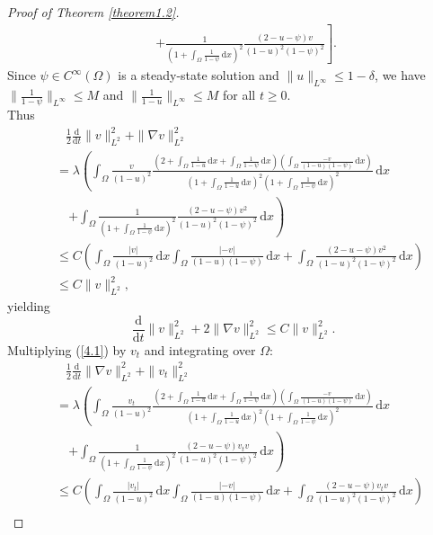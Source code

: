 \documentclass[10pt,a4paper]{amsart}
\begin{document}
\begin{proof}[Proof of Theorem \ref{theorem1.2}]
\begin{align*}
    &\quad\ \left.+\frac{1}{(1+\int_{\Omega}\frac{1}{1-\psi}\,\mathrm{d}x)^2}\frac{(2-u-\psi)v}{(1-u)^2(1-\psi)^2}\right].
\end{align*}
Since $\psi\in C^{\infty}(\Omega)$ is a steady-state solution and $\|u\|_{L^{\infty}}\le 1-\delta$, we have $\|\frac{1}{1-\psi}\|_{L^{\infty}}\le M$ and $\|\frac{1}{1-u}\|_{L^{\infty}}\le M$ for all $t\ge 0$.\\
\noindent
Thus
\begin{align*}
    &\quad\frac{1}{2}\frac{\mathrm{d}}{\mathrm{d}t}\|v\|_{L^2}^2+\|\nabla v\|_{L^2}^2\\
    &\ =\lambda\left(\int_{\Omega}\frac{v}{(1-u)^2}\frac{(2+\int_{\Omega}\frac{1}{1-u}\,\mathrm{d}x+\int_{\Omega}\frac{1}{1-\psi}\,\mathrm{d}x)(\int_{\Omega}\frac{-v}{(1-u)(1-\psi)}\,\mathrm{d}x)}{(1+\int_{\Omega}\frac{1}{1-u}\,\mathrm{d}x)^2(1+\int_{\Omega}\frac{1}{1-\psi}\,\mathrm{d}x)^2}\,\mathrm{d}x\right.\\
    &\quad\ \left.+\int_{\Omega}\frac{1}{(1+\int_{\Omega}\frac{1}{1-\psi}\,\mathrm{d}x)^2}\frac{(2-u-\psi)v^2}{(1-u)^2(1-\psi)^2}\,\mathrm{d}x\right)\\
    &\ \le C\left(\int_{\Omega}\frac{|v|}{(1-u)^2}\,\mathrm{d}x\int_{\Omega}\frac{|-v|}{(1-u)(1-\psi)}\,\mathrm{d}x+\int_{\Omega}\frac{(2-u-\psi)v^2}{(1-u)^2(1-\psi)^2}\,\mathrm{d}x\right)\\
    &\ \le C\|v\|_{L^2}^{2},
\end{align*}
yielding
\begin{equation}
    \frac{\mathrm{d}}{\mathrm{d}t}\|v\|_{L^2}^2+2\|\nabla v\|_{L^2}^2\le C\|v\|_{L^2}^{2}.\label{4.2}
\end{equation}
Multiplying (\ref{4.1}) by $v_t$ and integrating over $\Omega$:
\begin{align*}
    &\quad\frac{1}{2}\frac{\mathrm{d}}{\mathrm{d}t}\|\nabla v\|_{L^2}^2+\|v_t\|_{L^2}^2\\
    &\ =\lambda\left(\int_{\Omega}\frac{v_t}{(1-u)^2}\frac{(2+\int_{\Omega}\frac{1}{1-u}\,\mathrm{d}x+\int_{\Omega}\frac{1}{1-\psi}\,\mathrm{d}x)(\int_{\Omega}\frac{-v}{(1-u)(1-\psi)}\,\mathrm{d}x)}{(1+\int_{\Omega}\frac{1}{1-u}\,\mathrm{d}x)^2(1+\int_{\Omega}\frac{1}{1-\psi}\,\mathrm{d}x)^2}\,\mathrm{d}x\right.\\
    &\quad\ \left.+\int_{\Omega}\frac{1}{(1+\int_{\Omega}\frac{1}{1-\psi}\,\mathrm{d}x)^2}\frac{(2-u-\psi)v_t v}{(1-u)^2(1-\psi)^2}\,\mathrm{d}x\right)\\
    &\ \le C\left(\int_{\Omega}\frac{|v_t|}{(1-u)^2}\,\mathrm{d}x\int_{\Omega}\frac{|-v|}{(1-u)(1-\psi)}\,\mathrm{d}x+\int_{\Omega}\frac{(2-u-\psi)v_t v}{(1-u)^2(1-\psi)^2}\,\mathrm{d}x\right)\\

\end{align*}
\end{proof}
\end{document}

